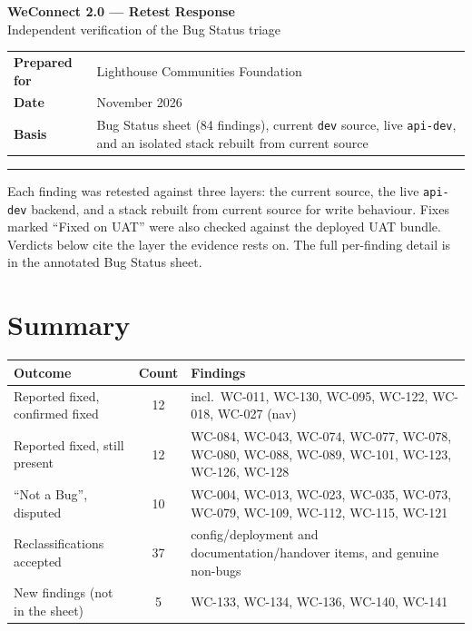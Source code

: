 \documentclass[11pt]{article}
\newcommand{\wc}[1]{\mbox{WC-#1}}
\begin{document}
\justifying

\begin{center}{\LARGE\bfseries WeConnect 2.0 --- Retest Response}\\[4pt]
{\large Independent verification of the Bug Status triage}\\[10pt]\end{center}
\begin{tabular}{@{}l>{\RaggedRight\arraybackslash}p{13cm}@{}}
\textbf{Prepared for} & Lighthouse Communities Foundation \\
\textbf{Date} & 4 November 2026 \\
\textbf{Basis} & Bug Status sheet (84 findings), current \texttt{dev} source, live \texttt{api-dev}, and an isolated stack rebuilt from current source \\
\end{tabular}
\vspace{3pt}\hrule\vspace{2pt}

Each finding was retested against three layers: the current source, the live \texttt{api-dev}
backend, and a stack rebuilt from current source for write behaviour. Fixes marked ``Fixed on UAT''
were also checked against the deployed UAT bundle. Verdicts below cite the layer the evidence rests
on. The full per-finding detail is in the annotated Bug Status sheet.

\section{Summary}
\begin{tabularx}{\textwidth}{@{}lcL@{}}
\toprule
\textbf{Outcome} & \textbf{Count} & \textbf{Findings} \\
\midrule
Reported fixed, confirmed fixed & 12 & incl.\ \wc{011}, \wc{130}, \wc{095}, \wc{122}, \wc{018}, \wc{027} (nav) \\
Reported fixed, still present & 12 & \wc{084}, \wc{043}, \wc{074}, \wc{077}, \wc{078}, \wc{080}, \wc{088}, \wc{089}, \wc{101}, \wc{123}, \wc{126}, \wc{128} \\
``Not a Bug'', disputed & 10 & \wc{004}, \wc{013}, \wc{023}, \wc{035}, \wc{073}, \wc{079}, \wc{109}, \wc{112}, \wc{115}, \wc{121} \\
Reclassifications accepted & 37 & config/deployment and documentation/handover items, and genuine non-bugs \\
New findings (not in the sheet) & 5 & \wc{133}, \wc{134}, \wc{136}, \wc{140}, \wc{141} \\
\bottomrule
\end{tabularx}
\end{document}
